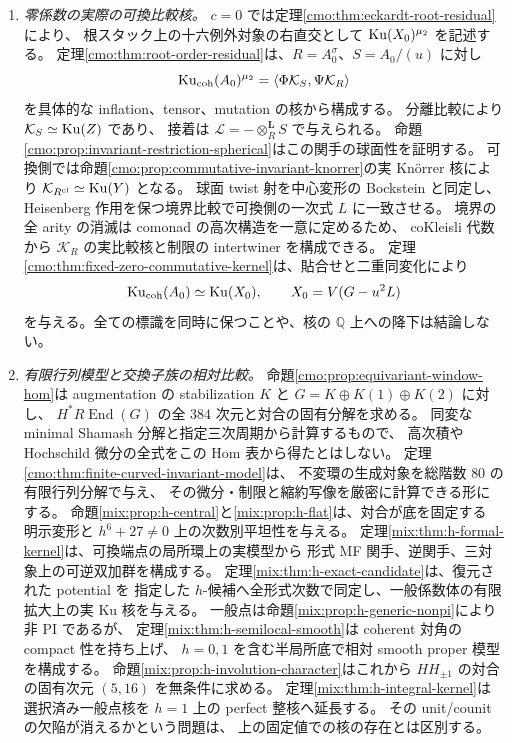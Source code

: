 \begin{enumerate}
 \item \emph{零係数の実際の可換比較核。}
 $c=0$ では定理\ref{cmo:thm:eckardt-root-residual}により、
 根スタック上の十六例外対象の右直交として
 $\operatorname{Ku}(X_0)^{\mu_2}$ を記述する。
 定理\ref{cmo:thm:root-order-residual}は、$R=A_0^\sigma$、$S=A_0/(u)$ に対し
 \[
  \operatorname{Ku}_{\mathrm{coh}}(A_0)^{\mu_2}
      =\langle\Phi\mathcal K_S,\Psi\mathcal K_R\rangle
 \]
 を具体的な inflation、tensor、mutation の核から構成する。
 分離比較により $\mathcal K_S\simeq\operatorname{Ku}(Z)$ であり、
 接着は $\mathcal L=-\otimes_R^{\mathbf L}S$ で与えられる。
 命題\ref{cmo:prop:invariant-restriction-spherical}はこの関手の球面性を証明する。
 可換側では命題\ref{cmo:prop:commutative-invariant-knorrer}の実 Kn\"orrer 核により
 $\mathcal K_{R^{\mathrm{cl}}}\simeq\operatorname{Ku}(Y)$ となる。
 球面 twist 射を中心変形の Bockstein と同定し、
 Heisenberg 作用を保つ境界比較で可換側の一次式 $L$ に一致させる。
 境界の全 arity の消滅は comonad の高次構造を一意に定めるため、
 coKleisli 代数から $\mathcal K_R$ の実比較核と制限の intertwiner を構成できる。
 定理\ref{cmo:thm:fixed-zero-commutative-kernel}は、貼合せと二重同変化により
 \[
  \operatorname{Ku}_{\mathrm{coh}}(A_0)\simeq\operatorname{Ku}(X_0),\qquad X_0=V(G-u^2L)
 \]
 を与える。全ての標識を同時に保つことや、核の $\mathbb Q$ 上への降下は結論しない。

 \item \emph{有限行列模型と交換子族の相対比較。}
 命題\ref{cmo:prop:equivariant-window-hom}は augmentation の stabilization
 $K$ と $G=K\oplus K(1)\oplus K(2)$ に対し、
 $H^*R\operatorname{End}(G)$ の全 $384$ 次元と対合の固有分解を求める。
 同変な minimal Shamash 分解と指定三次周期から計算するもので、
 高次積や Hochschild 微分の全式をこの Hom 表から得たとはしない。
 定理\ref{cmo:thm:finite-curved-invariant-model}は、
 不変環の生成対象を総階数 $80$ の有限行列分解で与え、
 その微分・制限と縮約写像を厳密に計算できる形にする。
 命題\ref{mix:prop:h-central}と\ref{mix:prop:h-flat}は、対合が底を固定する
 明示変形と $h^6+27\ne0$ 上の次数別平坦性を与える。
 定理\ref{mix:thm:h-formal-kernel}は、可換端点の局所環上の実模型から
 形式 MF 関手、逆関手、三対象上の可逆双加群を構成する。
 定理\ref{mix:thm:h-exact-candidate}は、復元された potential を
 指定した $h$-候補へ全形式次数で同定し、一般係数体の有限拡大上の実 Ku 核を与える。
 一般点は命題\ref{mix:prop:h-generic-nonpi}により非 PI であるが、
 定理\ref{mix:thm:h-semilocal-smooth}は coherent 対角の compact 性を持ち上げ、
 $h=0,1$ を含む半局所底で相対 smooth proper 模型を構成する。
 命題\ref{mix:prop:h-involution-character}はこれから
 $HH_{\pm1}$ の対合の固有次元 $(5,16)$ を無条件に求める。
 定理\ref{mix:thm:h-integral-kernel}は選択済み一般点核を
 $h=1$ 上の perfect 整核へ延長する。
 その unit/counit の欠陥が消えるかという問題は、
 上の固定値での核の存在とは区別する。
\end{enumerate}

